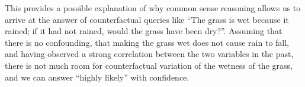 This provides a possible explanation of why common sense reasoning allows us to arrive at the answer of counterfactual queries like
``The grass is wet because it rained; if it had not rained, would the grass have been dry?''. 
Assuming that there is no confounding, that making the grass wet does not cause rain to fall, and having observed a strong correlation between the two variables in the past, there is not much room for counterfactual variation of the wetness of the grass, and we can answer ``highly likely'' with confidence.




